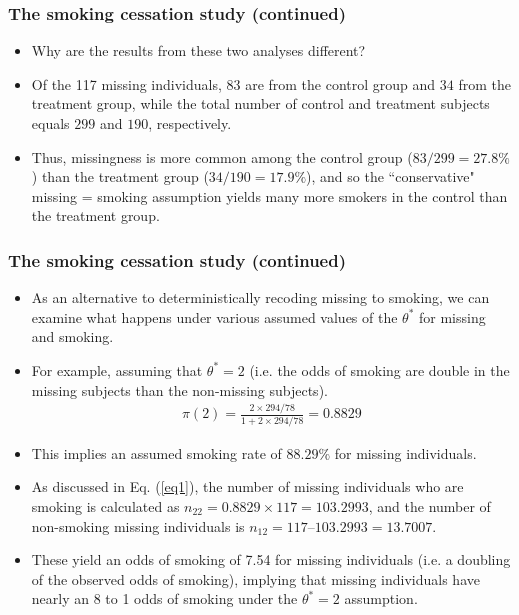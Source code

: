\documentclass{beamer}
\begin{document}
\begin{frame}
\frametitle{The smoking cessation study (continued)}
\begin{itemize}
\item Why are the results from these two analyses different?
\vspace{10pt}
\item Of the 117 missing individuals, $83$ are from the control group and $34$ from the treatment group, while the total
number of control and treatment subjects equals $299$ and $190$, respectively. 
\vspace{10pt}
\item Thus, missingness is more common among the control group ($83/299 = 27.8\%$) than the treatment group ($34/190 = 17.9\%$), and so the ``conservative" missing = smoking assumption yields many more smokers in the control than the treatment group.
\end{itemize}
\end{frame}
\begin{frame}
\frametitle{The smoking cessation study (continued)}
\begin{itemize}
\item As an alternative to deterministically recoding missing to smoking, we can examine what happens under various assumed values of the $\theta^*$ for missing and smoking.
\vspace{10pt}
\item For example, assuming that $\theta^* = 2$ (i.e. the odds of smoking are double in the missing subjects than the non-missing subjects).
\begin{align}
\pi(2) = \frac{2\times 294/78}{1 + 2\times 294/78} = 0.8829
\end{align}
\item This implies an assumed smoking rate of $88.29\%$ for missing individuals. 
\vspace{10pt}
\item As discussed in Eq. (\ref{eq1}), the number of missing individuals who are smoking is calculated as $n_{22} = 0.8829 \times 117 =
103.2993$, and the number of non-smoking missing individuals is $n_{12} = 117–103.2993 = 13.7007$. 
\vspace{10pt}
\item These yield an odds of smoking of 7.54 for missing individuals (i.e. a doubling of the observed odds of smoking), implying
that missing individuals have nearly an 8 to 1 odds of smoking under the $\theta^* = 2$ assumption.
\end{itemize}
\end{frame}
\end{document}
